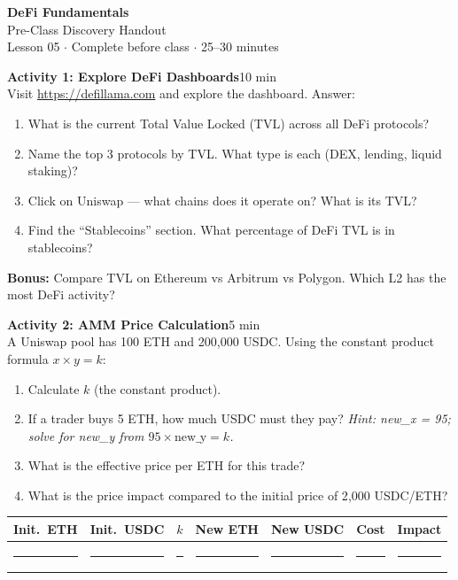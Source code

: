 \documentclass[11pt,a4paper]{article}
\newcommand{\activitybox}[3]{%
  \noindent\colorbox{mllavender4}{\parbox{\dimexpr\linewidth-2\fboxsep}{%
    \textbf{\color{mlpurple}#1}\hfill\textcolor{mlgray}{\small #2}\\[2pt]#3%
  }}\par\vspace{4pt}%
}
\begin{document}
\begin{center}
{\LARGE\color{mlpurple}\textbf{DeFi Fundamentals}}\\[4pt]
{\large\color{mlblue}Pre-Class Discovery Handout}\\[2pt]
{\small\color{mlgray}Lesson 05 $\cdot$ Complete before class $\cdot$ 25--30 minutes}
\end{center}
\vspace{4pt}

\activitybox{Activity 1: Explore DeFi Dashboards}{10 min}{%
Visit \url{https://defillama.com} and explore the dashboard. Answer:
\begin{enumerate}
\item What is the current Total Value Locked (TVL) across all DeFi protocols?
\item Name the top 3 protocols by TVL. What type is each (DEX, lending, liquid staking)?
\item Click on Uniswap --- what chains does it operate on? What is its TVL?
\item Find the ``Stablecoins'' section. What percentage of DeFi TVL is in stablecoins?
\end{enumerate}
\textbf{Bonus:} Compare TVL on Ethereum vs Arbitrum vs Polygon. Which L2 has the most DeFi activity?
}

\vspace{2pt}

\activitybox{Activity 2: AMM Price Calculation}{5 min}{%
A Uniswap pool has 100 ETH and 200{,}000 USDC. Using the constant product formula $x \times y = k$:
\begin{enumerate}
\item Calculate $k$ (the constant product).
\item If a trader buys 5 ETH, how much USDC must they pay?
      \textit{Hint: new\_x = 95; solve for new\_y from $95 \times \text{new\_y} = k$.}
\item What is the effective price per ETH for this trade?
\item What is the price impact compared to the initial price of 2{,}000 USDC/ETH?
\end{enumerate}
\vspace{4pt}
{\footnotesize\renewcommand{\arraystretch}{1.35}%
\setlength{\tabcolsep}{4pt}%
\begin{tabular}{@{}lllllll@{}}
\toprule
\textbf{Init.\ ETH} & \textbf{Init.\ USDC} & \textbf{$k$} & \textbf{New ETH} & \textbf{New USDC} & \textbf{Cost} & \textbf{Impact} \\
\midrule
\rule{1.5cm}{0.3pt} & \rule{1.6cm}{0.3pt} & \rule{2.0cm}{0.3pt} & \rule{1.5cm}{0.3pt} & \rule{1.6cm}{0.3pt} & \rule{1.5cm}{0.3pt} & \rule{1.5cm}{0.3pt} \\
\bottomrule
\end{tabular}}
\vspace{2pt}
}
\end{document}

